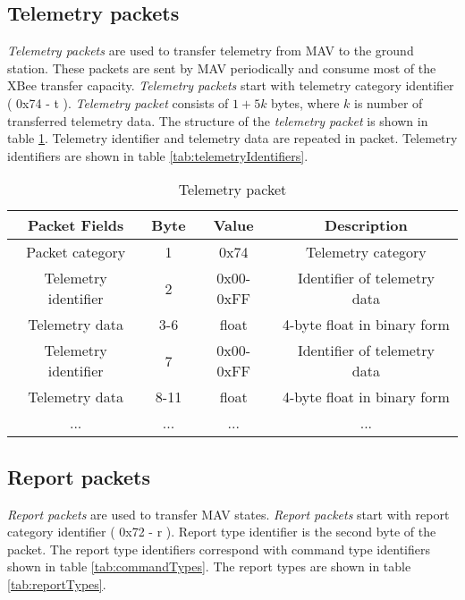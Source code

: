 \subsection{Telemetry packets}
\label{sec:telemeteryPackets}
\textit{Telemetry packets} are used to transfer telemetry from MAV to the ground station. These packets are sent by MAV periodically and consume most of the XBee transfer capacity. \textit{Telemetry packets} start with telemetry category identifier ( 0x74 - t ). \textit{Telemetry packet} consists of $1+5k$ bytes, where $k$ is number of transferred telemetry data. The structure of the \textit{telemetry packet} is shown in table \ref{tab:telemetryPacket}. Telemetry identifier and telemetry data are repeated in packet. Telemetry identifiers are shown in table \ref{tab:telemetryIdentifiers}.
\begin{table}[H]
\begin{center}
\begin{tabular}{c c c c}
\toprule
\rowcolor[HTML]{FFFC9E} 
\textbf{Packet Fields} & \textbf{Byte} & \textbf{Value} & \textbf{Description}         \\ \midrule
Packet category        & 1             & 0x74           & Telemetry category           \\ [1ex]
Telemetry identifier   & 2             & 0x00-0xFF      & Identifier of telemetry data \\ [1ex]
Telemetry data         & 3-6           & float          & 4-byte float in binary form  \\ [1ex]
Telemetry identifier   & 7             & 0x00-0xFF      & Identifier of telemetry data \\ [1ex]
Telemetry data         & 8-11          & float          & 4-byte float in binary form  \\ [1ex]
...                    & ...           & ...            & ...          				   \\ [1ex] \bottomrule              
\end{tabular}
\end{center}
\caption{Telemetry packet}
\label{tab:telemetryPacket}
\end{table}



\subsection{Report packets}
\label{sec:reportPackets}
\textit{Report packets} are used to transfer MAV states.  \textit{Report packets} start with report category identifier ( 0x72 - r ). Report type identifier is the second byte of the packet. The report type identifiers correspond with command type identifiers shown in table \ref{tab:commandTypes}. The report types are shown in table \ref{tab:reportTypes}.

